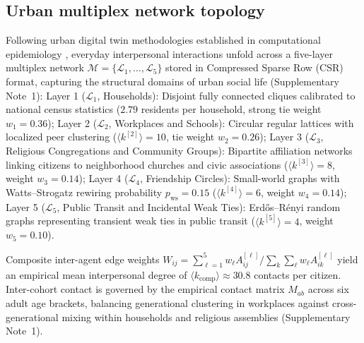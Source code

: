 \documentclass[11pt,a4paper]{article}
\begin{document}
\subsection*{Urban multiplex network topology}
Following urban digital twin methodologies established in computational epidemiology \citep{lopes2022measuring}, everyday interpersonal interactions unfold across a five-layer multiplex network $\mathcal{M} = \{\mathcal{L}_1, \dots, \mathcal{L}_5\}$ stored in Compressed Sparse Row (CSR) format, capturing the structural domains of urban social life (Supplementary Note~1):
Layer 1 ($\mathcal{L}_1$, Households): Disjoint fully connected cliques calibrated to national census statistics ($2.79$ residents per household, strong tie weight $w_1 = 0.36$);
Layer 2 ($\mathcal{L}_2$, Workplaces and Schools): Circular regular lattices with localized peer clustering ($\langle k^{[2]} \rangle = 10$, tie weight $w_2 = 0.26$);
Layer 3 ($\mathcal{L}_3$, Religious Congregations and Community Groups): Bipartite affiliation networks linking citizens to neighborhood churches and civic associations ($\langle k^{[3]} \rangle = 8$, weight $w_3 = 0.14$);
Layer 4 ($\mathcal{L}_4$, Friendship Circles): Small-world graphs with Watts--Strogatz rewiring probability $p_{\mathrm{ws}} = 0.15$ ($\langle k^{[4]} \rangle = 6$, weight $w_4 = 0.14$);
Layer 5 ($\mathcal{L}_5$, Public Transit and Incidental Weak Ties): Erd\H{o}s--R\'enyi random graphs representing transient weak ties in public transit ($\langle k^{[5]} \rangle = 4$, weight $w_5 = 0.10$).

Composite inter-agent edge weights $W_{ij} = \sum_{\ell=1}^5 w_\ell A_{ij}^{[\ell]} / \sum_k \sum_\ell w_\ell A_{ik}^{[\ell]}$ yield an empirical mean interpersonal degree of $\langle k_{\mathrm{comp}} \rangle \approx 30.8$ contacts per citizen. Inter-cohort contact is governed by the empirical contact matrix $M_{ab}$ across six adult age brackets, balancing generational clustering in workplaces against cross-generational mixing within households and religious assemblies (Supplementary Note~1).
\end{document}
